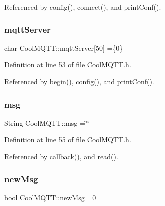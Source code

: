 Referenced by config(), connect(), and print\+Conf().

\mbox{\label{classCoolMQTT_ab8bb951f87ddbf92db74c2ad16a3e53e}} 
\subsubsection{\texorpdfstring{mqtt\+Server}{mqttServer}}
{\footnotesize\ttfamily char Cool\+M\+Q\+T\+T\+::mqtt\+Server\mbox{[}50\mbox{]} =\{\textquotesingle{}0\textquotesingle{}\}\hspace{0.3cm}{\ttfamily [private]}}



Definition at line 53 of file Cool\+M\+Q\+T\+T.\+h.



Referenced by begin(), config(), and print\+Conf().

\mbox{\label{classCoolMQTT_af6b19e7074dbbb4ae493c44dcb53f7ff}} 
\subsubsection{\texorpdfstring{msg}{msg}}
{\footnotesize\ttfamily String Cool\+M\+Q\+T\+T\+::msg =\char`\"{}\char`\"{}\hspace{0.3cm}{\ttfamily [private]}}



Definition at line 55 of file Cool\+M\+Q\+T\+T.\+h.



Referenced by callback(), and read().

\mbox{\label{classCoolMQTT_a3240388137b885775aadf38e96b24c6b}} 
\subsubsection{\texorpdfstring{new\+Msg}{newMsg}}
{\footnotesize\ttfamily bool Cool\+M\+Q\+T\+T\+::new\+Msg =0\hspace{0.3cm}{\ttfamily [private]}}



